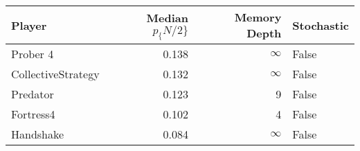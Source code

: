 \begin{tabular}{lrrl}
\toprule
             Player &  Median $p_\{N/2\}$ &  Memory Depth & Stochastic \\
\midrule
           Prober 4 &             0.138 &            \(\infty\) &      False \\
 CollectiveStrategy &             0.132 &            \(\infty\) &      False \\
           Predator &             0.123 &             9 &      False \\
          Fortress4 &             0.102 &             4 &      False \\
          Handshake &             0.084 &            \(\infty\) &      False \\
\bottomrule
\end{tabular}
